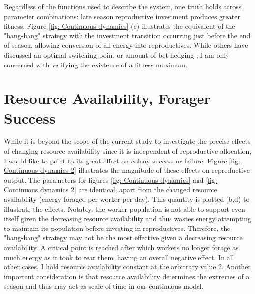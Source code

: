 \documentclass[12pt]{report}
\begin{document}
Regardless of the functions used to describe the system, one truth holds across parameter combinations: late season reproductive investment produces greater fitness. Figure \ref{fig: Continuous dynamics} (c)  illustrates the equivalent of the "bang-bang" strategy with the investment transition occurring just before the end of season, allowing conversion of all energy into reproductives. While others have discussed an optimal switching point or amount of bet-hedging \cite{poitrineau2009workers}, I am only concerned with verifying the existence of a fitness maximum. 

\section*{Resource Availability, Forager Success}
While it is beyond the scope of the current study to investigate the precise effects of changing resource availability since it is independent of reproductive allocation, I would like to point to its great effect on colony success or failure. Figure \ref{fig: Continuous dynamics 2} illustrates the magnitude of these effects on reproductive output. The parameters for figures \ref{fig: Continuous dynamics} and \ref{fig: Continuous dynamics 2} are identical, apart from the changed resource availability (energy foraged per worker per day). This quantity is plotted (b,d) to illustrate the effects. Notably, the worker population is not able to support even itself given the decreasing resource availability and thus wastes energy attempting to maintain its population before investing in reproductives. Therefore, the "bang-bang" strategy may not be the most effective given a decreasing resource availability. A critical point is reached after which workers no longer forage as much energy as it took to rear them, having an overall negative effect. In all other cases, I hold resource availability constant at the arbitrary value 2. Another important consideration is that resource availability determines the extremes of a season and thus may act as scale of time in our continuous model. 
\end{document}
